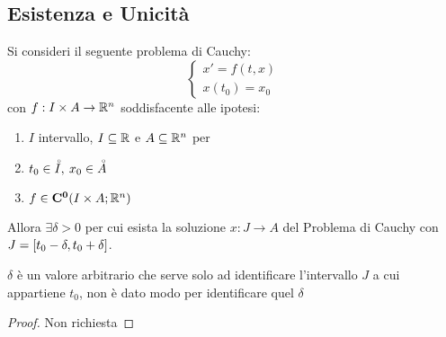 \subsection{Esistenza e Unicità}
\begin{theorem}[di Peano]
	\label{teo:peano}
	Si consideri il seguente problema di Cauchy:
	\[\left\{\begin{matrix} x'=f(t,x)\\x(t_0)=x_0\end{matrix}\right.\]
	con $f:I\times A \to \mathbb{R}^n$ soddisfacente alle ipotesi:
	\begin{enumerate}
		\item $I$ intervallo, $I \subseteq \mathbb{R}$ e $A\subseteq \mathbb{R}^n$ per 
		\item $t_0\in \accentset{\circ}{I},\: x_0\in \accentset{\circ}{A}$
		\item $f\in \mathbf{C^{0}}(I\times A;\mathbb{R}^n)$
	\end{enumerate}
	Allora $\exists \delta > 0$ per cui esista la soluzione $x: J \to A$ del Problema di Cauchy con $J = \left[t_0-\delta,t_0+\delta\right]$.
	\begin{note}
		$\delta$ è un valore arbitrario che serve solo ad identificare l'intervallo $J$ a cui appartiene $t_0$, non è dato modo per identificare quel $\delta$
	\end{note}
	\begin{proof}
		Non richiesta
	\end{proof}
\end{theorem}
